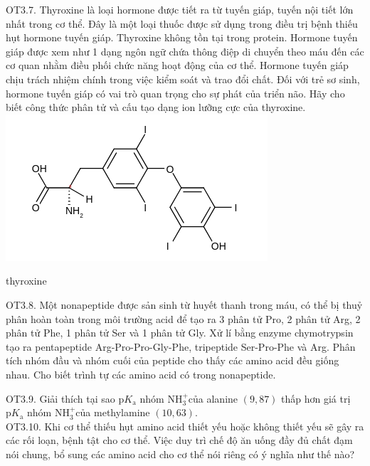 \documentclass[10pt]{article}
\begin{document}
OT3.7. Thyroxine là loại hormone được tiết ra từ tuyến giáp, tuyến nội tiết lớn nhất trong cơ thể. Đây là một loại thuốc được sử dụng trong điều trị bệnh thiếu hụt hormone tuyến giáp. Thyroxine không tồn tại trong protein. Hormone tuyến giáp được xem như 1 dạng ngôn ngữ chứa thông điệp di chuyển theo máu đến các cơ quan nhằm điều phối chức năng hoạt động của cơ thể. Hormone tuyến giáp chịu trách nhiệm chính trong việc kiểm soát và trao đổi chất. Đối với trẻ sơ sinh, hormone tuyến giáp có vai trò quan trọng cho sự phát của triển não. Hãy cho biết công thức phân tử và cấu tạo dạng ion lưỡng cực của thyroxine.\\
\includegraphics{smile-e4e14a6bc1bd26a51d7837da03443bdd5c56217b}

thyroxine

OT3.8. Một nonapeptide được sản sinh từ huyết thanh trong máu, có thể bị thuỷ phân hoàn toàn trong môi trường acid để tạo ra 3 phân tử Pro, 2 phân tử Arg, 2 phân tử Phe, 1 phân tử Ser và 1 phân tử Gly. Xử lí bằng enzyme chymotrypsin tạo ra pentapeptide Arg-Pro-Pro-Gly-Phe, tripeptide Ser-Pro-Phe và Arg. Phân tích nhóm đầu và nhóm cuối của peptide cho thấy các amino acid đều giống nhau. Cho biết trình tự các amino acid có trong nonapeptide.

OT3.9. Giải thích tại sao $\mathrm{p} K_{\mathrm{a}}$ nhóm $\mathrm{NH}_{3}^{+}$của alanine $(9,87)$ thấp hơn giá trị $\mathrm{p} K_{\mathrm{a}}$ nhóm $\mathrm{NH}_{3}^{+}$của methylamine $(10,63)$.\\
OT3.10. Khi cơ thể thiếu hụt amino acid thiết yếu hoặc không thiết yếu sẽ gây ra các rối loạn, bệnh tật cho cơ thể. Việc duy trì chế độ ăn uống đầy đủ chất đạm nói chung, bổ sung các amino acid cho cơ thể nói riêng có ý nghĩa như thế nào?
\end{document}
